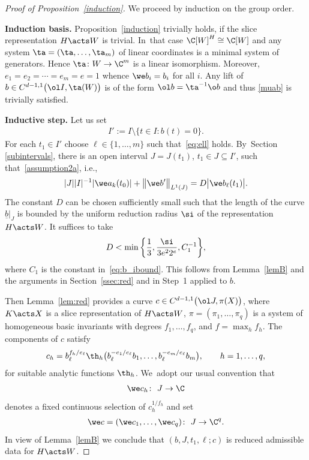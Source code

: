 \begin{proof}[Proof of Proposition~\ref{induction}]
	We proceed by induction on the group order.


\medskip\noindent
{\bf Induction basis.}
Proposition~\ref{induction} trivially holds, if the slice representation $H \acts W$
is trivial. In~that case $\C[W]^H \cong \C[W]$ and any system $\ta = (\ta,\dots,\ta_m)$ of linear coordinates
is a minimal system of generators. Hence $\ta \colon W \to \C^m$ is a linear isomorphism.
Moreover, $e_1 = e_2 = \cdots = e_m = e =1$ whence $\we b_i = b_i$ for all $i$.
Any lift of $b \in C^{d-1,1}\big(\ol I,\ta(W)\big)$ is of the form $\ol b = \ta^{-1} \o b$ and thus
\eqref{muab} is trivially satisfied.

\medskip\noindent
{\bf Inductive step.}
Let us set
\begin{gather*}
 I' := I \setminus \{t \in I \colon b(t) = 0\}.
\end{gather*}
For each $t_1 \in I'$ choose $\ell \in \{1, \dots, m\}$ such that~\eqref{eq:ell} holds. By~Section \ref{subintervals}, there is an open interval $J = J(t_1)$, $t_1 \in J \subseteq I'$,
such that~\eqref{assumption2a}, i.e.,
\begin{gather*}
 | J| |I|^{-1} {|\we a_k(t_0)|}
 + \big\|\we b'\big\|_{L^1 (J)} = D \big|\we b_\ell(t_1)\big| .
\end{gather*}
The constant $D$
can be chosen sufficiently small such that the length of the curve $\underline b|_J$ is bounded by
the uniform reduction radius $\si$ of the representation $H \acts W$.
It suffices to take
\begin{gather} \label{D}
 D < \min\bigg\{\frac 1 3, \frac{\si}{3 e^2 2^{e}}, C_1^{-1}\bigg\},
\end{gather}
where $C_1$ is the constant in~\eqref{eq:b_ibound}.
This follows from Lemma~\ref{lemB}
and the arguments in Section~\ref{ssec:red} and in Step~1 applied to $b$.

Then Lemma~\ref{lem:red} provides a curve $c \in C^{d-1,1}\big(\ol J, \pi(X)\big)$, where $K \acts X$ is a slice representation
of $H \acts W$, $\pi = (\pi_1,\dots,\pi_q)$ is a system of homogeneous basic invariants with degrees $f_1,\dots,f_q$,
and $f = \max_h f_h$.
The components of $c$ satisfy
\begin{gather*} %
 c_h = b_\ell^{f_h/e_\ell} \th_h \big(b_\ell^{-e_1/e_\ell} b_1, \dots, b_\ell^{-e_m/e_\ell} b_m\big), \qquad h = 1,\dots,q,
\end{gather*}
for suitable analytic functions $\th_h$. We~adopt our usual convention that
\begin{gather*}
\we c_h \colon\ J \to \C
\end{gather*}
denotes a fixed continuous selection of $c_h ^{1/f_h}$ and
set
\begin{gather*}
	\we c = (\we c_1 ,\dots,\we c_q) \colon\ J \to \C^q.
\end{gather*}
In view of Lemma~\ref{lemB} we conclude that $(b,J,t_1,\ell; c)$ is reduced admissible data for $H \acts W$.








\end{proof}
